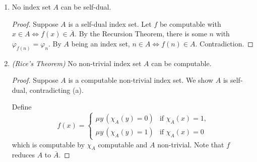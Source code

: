 \documentclass[a4paper,11pt]{article}
\begin{document}
\begin{enumerate}[label=(\alph*)]

\item
No index set $A$ can be self-dual.

\begin{proof}
Suppose $A$ is a self-dual index set.
Let $f$ be computable with $x \in A \Leftrightarrow f(x) \in \overline{A}$.
By the Recursion Theorem, there is some $n$ with $\varphi_{f(n)} = \varphi_n$.
By $A$ being an index set, $n \in A \Leftrightarrow f(n) \in A$.
Contradiction.
\end{proof}

\item
\emph{(Rice's Theorem)} No non-trivial index set $A$ can be computable.

\begin{proof}
Suppose $A$ is a computable non-trivial index set. We show $A$ is self-dual, contradicting (a).

Define
\begin{equation*}
f(x) = \begin{cases}
  \mu y \, ( \chi_A(y) = 0 ) & \text{if $\chi_A(x) = 1$,}\\
  \mu y \, ( \chi_A(y) = 1 ) & \text{if $\chi_A(x) = 0$}
\end{cases}
\end{equation*}
which is computable by $\chi_A$ computable and $A$ non-trivial.
Note that $f$ reduces $A$ to $\overline{A}$.
\end{proof}

\end{enumerate}
\end{document}
